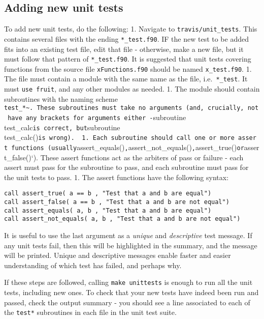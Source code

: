 \subsection{Adding new unit tests}\label{adding-new-unit-tests}

To add new unit tests, do the following: 1. Navigate to
\texttt{travis/unit\_tests}. This contains several files with the ending
\texttt{*\_test.f90}. IF the new test to be added fits into an existing
test file, edit that file - otherwise, make a new file, but it must
follow that pattern of \texttt{*\_test.f90}. It is suggested that unit
tests covering functions from the source file \texttt{xFunctions.f90}
should be named \texttt{x\_test.f90}. 1. The file must contain a module
with the same name as the file, i.e.~\texttt{*\_test}. It must
\texttt{use\ fruit}, and any other modules as needed. 1. The module
should contain subroutines with the naming scheme
\texttt{test\_*\textasciitilde{}.\ These\ subroutines\ must\ take\ no\ arguments\ (and,\ crucially,\ not\ have\ any\ brackets\ for\ arguments\ either\ -}subroutine
test\_calc\texttt{is\ correct,\ but}subroutine
test\_calc()\texttt{is\ wrong).\ \ 1.\ Each\ subroutine\ should\ call\ one\ or\ more\ assert\ functions\ (usually}assert\_equals()\texttt{,}assert\_not\_equals()\texttt{,}assert\_true()\texttt{or}assert\_false()`).
These assert functions act as the arbiters of pass or failure - each
assert must pass for the subroutine to pass, and each subroutine must
pass for the unit tests to pass. 1. The assert functions have the
following syntax:

\begin{verbatim}
call assert_true( a == b , "Test that a and b are equal")
call assert_false( a == b , "Test that a and b are not equal")
call assert_equals( a, b , "Test that a and b are equal")
call assert_not_equals( a, b , "Test that a and b are not equal")
\end{verbatim}

It is useful to use the last argument as a \emph{unique} and
\emph{descriptive} test message. If any unit tests fail, then this will
be highlighted in the summary, and the message will be printed. Unique
and descriptive messages enable faster and easier understanding of which
test has failed, and perhaps why.

If these steps are followed, calling \texttt{make\ unittests} is enough
to run all the unit tests, including new ones. To check that your new
tests have indeed been run and passed, check the output summary - you
should see a line associated to each of the \texttt{test*} subroutines
in each file in the unit test suite.

